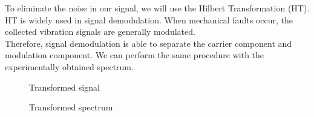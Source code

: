 \documentclass[9pt,twocolumn,twoside]{osajnl}
\begin{document}
To eliminate the noise in our signal, we will use the Hilbert Transformation (HT). HT is widely used in signal demodulation. When mechanical faults occur, the collected vibration signals are generally modulated. \\
Therefore, signal demodulation is able to separate the carrier component and modulation component. We can perform the same procedure with the experimentally obtained spectrum.

\begin{figure}[htbp]
\centering
{}
\caption{Transformed signal}
\label{fig:false-color}
\end{figure}




\begin{figure}[ht!]
\centering
{}
\caption{Transformed spectrum}
\label{fig:false-color}
\end{figure}
\end{document}
